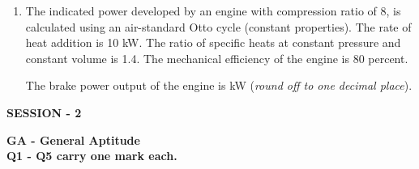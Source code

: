 \documentclass[12pt,onecolumn]{article}
\begin{document}
\begin{enumerate}
    \item The indicated power developed by an engine with compression ratio of 8, is calculated using an air-standard Otto cycle (constant properties). The rate of heat addition is 10 kW. The ratio of specific heats at constant pressure and constant volume is 1.4. The mechanical efficiency of the engine is 80 percent.

          The brake power output of the engine is \underline{\hspace{2cm}} kW (\textit{round off to one decimal place}).
\end{enumerate}

\pagebreak
\begin{center}
    \Large\textbf{SESSION - 2}\\
\end{center}
\noindent\large\textbf{GA - General Aptitude}\\
\normalsize\textbf{Q1 - Q5 carry one mark each.}
\end{document}
